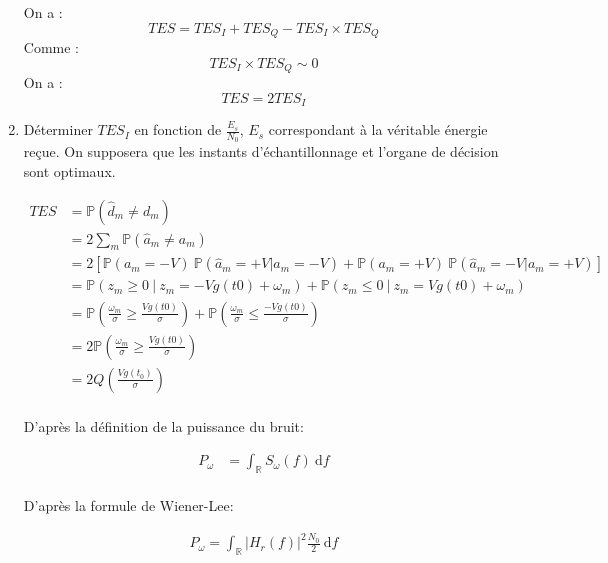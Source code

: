 \documentclass[frenchb]{article}
\begin{document}
\begin{enumerate}
    On a : 
    $$ TES = TES_I + TES_Q - TES_I \times TES_Q $$
    Comme : 
    $$TES_I \times TES_Q \sim 0$$
    On a : 
    $$\boxed{TES = 2 TES_I}$$
    
    \item Déterminer $TES_I$ en fonction de $\frac{E_s}{N_0}$, $E_s$ correspondant à la véritable énergie reçue. On supposera que les instants d'échantillonnage et l'organe de décision sont optimaux.
    
    \begin{equation*}
    \begin{split}
    TES & = \mathbb{P}(\hat{d}_m \ne d_m) \\
    & = 2 \sum_{m} \mathbb{P}(\hat{a}_m \ne a_m) \\
    & = 2 \left[\mathbb{P}(a_m = -V) \ \mathbb{P}(\hat{a}_m = + V | a_m = -V) + \mathbb{P}(a_m = +V) \ \mathbb{P}(\hat{a}_m = - V | a_m = +V)\right] \\
    & = \mathbb{P}\left(z_m \geq 0 \ | \ z_m = -V g(t0) + \omega_m\right) + \mathbb{P}\left(z_m \leq 0 \ | \ z_m = V g(t0) + \omega_m\right)\\
    & = \mathbb{P}\left(\frac{\omega_m}{\sigma} \geq \frac{Vg(t0)}{\sigma}\right) + \mathbb{P}\left(\frac{\omega_m}{\sigma} \leq \frac{-Vg(t0)}{\sigma}\right)\\
    & = 2 \mathbb{P}\left(\frac{\omega_m}{\sigma} \geq \frac{Vg(t0)}{\sigma}\right) \\
    & = 2 Q\left(\frac{V g(t_0)}{\sigma} \right) \\
    \end{split}    
    \end{equation*}
         
        D'après la définition de la puissance du bruit:
        
        \begin{equation*}
        \begin{split}
        P_{\omega} &= \int_\mathbb{R}S_{\omega}(f) \ \mathrm{d}f \\
        \end{split}
        \end{equation*}
        
        D'après la formule de Wiener-Lee:
        
        \begin{equation*}
        \begin{split}
        P_{\omega} = \int_{\mathbb{R}}|H_r(f)|^2 \frac{N_0}{2} \ \mathrm{d}f \\
        \end{split}
        \end{equation*}
        

\end{enumerate}
\end{document}
